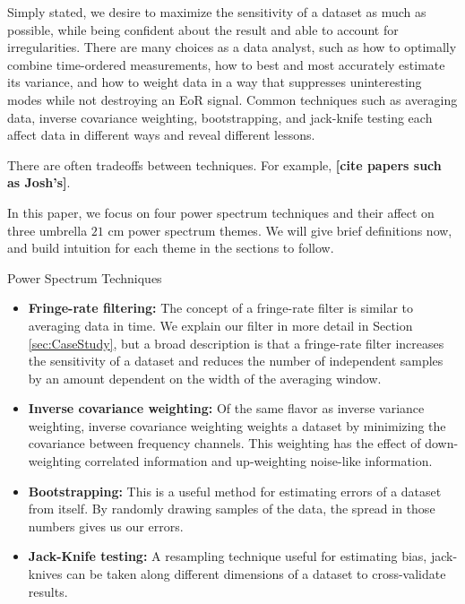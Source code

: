 \documentclass[preprint2,numberedappendix,tighten,twocolappendix]{aastex6}  %
\newcommand{\cc}[1]{{\color{purple} \textbf{[#1]}}}
\begin{document}
Simply stated, we desire to maximize the sensitivity of a dataset as much as possible, while being confident about the result and able to account for irregularities. There are many choices as a data analyst, such as how to optimally combine time-ordered measurements, how to best and most accurately estimate its variance, and how to weight data in a way that suppresses uninteresting modes while not destroying an EoR signal. Common techniques such as averaging data, inverse covariance weighting, bootstrapping, and jack-knife testing each affect data in different ways and reveal different lessons.

There are often tradeoffs between techniques. For example, \cc{cite papers such as Josh's}. 

In this paper, we focus on four power spectrum techniques and their affect on three umbrella $21$ cm power spectrum themes. We will give brief definitions now, and build intuition for each theme in the sections to follow.

\begin{center}
Power Spectrum Techniques
\end{center}
\begin{itemize}
\item \textbf{Fringe-rate filtering:} The concept of a fringe-rate filter is similar to averaging data in time. We explain our filter in more detail in Section \ref{sec:CaseStudy}, but a broad description is that a fringe-rate filter increases the sensitivity of a dataset and reduces the number of independent samples by an amount dependent on the width of the averaging window.
\item \textbf{Inverse covariance weighting:} Of the same flavor as inverse variance weighting, inverse covariance weighting weights a dataset by minimizing the covariance between frequency channels. This weighting has the effect of down-weighting correlated information and up-weighting noise-like information.
\item \textbf{Bootstrapping:} This is a useful method for estimating errors of a dataset from itself. By randomly drawing samples of the data, the spread in those numbers gives us our errors.
\item \textbf{Jack-Knife testing:} A resampling technique useful for estimating bias, jack-knives can be taken along different dimensions of a dataset to cross-validate results.
\end{itemize}
\end{document}
